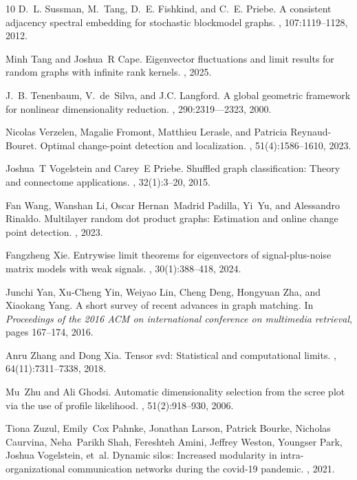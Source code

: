 \documentclass[12pt]{article}
\theoremstyle{definition}
\begin{document}
\begin{thebibliography}{10}
D.~L. Sussman, M.~Tang, D.~E. Fishkind, and C.~E. Priebe.
\newblock A consistent adjacency spectral embedding for stochastic blockmodel graphs.
, 107:1119--1128, 2012.

Minh Tang and Joshua~R Cape.
\newblock Eigenvector fluctuations and limit results for random graphs with infinite rank kernels.
, 2025.

J.~B. Tenenbaum, V.~de~Silva, and J.C. Langford.
\newblock A global geometric framework for nonlinear dimensionality reduction.
, 290:2319---2323, 2000.

Nicolas Verzelen, Magalie Fromont, Matthieu Lerasle, and Patricia Reynaud-Bouret.
\newblock Optimal change-point detection and localization.
, 51(4):1586--1610, 2023.

Joshua~T Vogelstein and Carey~E Priebe.
\newblock Shuffled graph classification: Theory and connectome applications.
, 32(1):3--20, 2015.

Fan Wang, Wanshan Li, Oscar Hernan~Madrid Padilla, Yi~Yu, and Alessandro Rinaldo.
\newblock Multilayer random dot product graphs: Estimation and online change point detection.
, 2023.

Fangzheng Xie.
\newblock Entrywise limit theorems for eigenvectors of signal-plus-noise matrix models with weak signals.
, 30(1):388--418, 2024.

Junchi Yan, Xu-Cheng Yin, Weiyao Lin, Cheng Deng, Hongyuan Zha, and Xiaokang Yang.
\newblock A short survey of recent advances in graph matching.
\newblock In {\em Proceedings of the 2016 ACM on international conference on multimedia retrieval}, pages 167--174, 2016.

Anru Zhang and Dong Xia.
\newblock Tensor svd: Statistical and computational limits.
, 64(11):7311--7338, 2018.

Mu~Zhu and Ali Ghodsi.
\newblock Automatic dimensionality selection from the scree plot via the use of profile likelihood.
, 51(2):918--930, 2006.

Tiona Zuzul, Emily~Cox Pahnke, Jonathan Larson, Patrick Bourke, Nicholas Caurvina, Neha~Parikh Shah, Fereshteh Amini, Jeffrey Weston, Youngser Park, Joshua Vogelstein, et~al.
\newblock Dynamic silos: Increased modularity in intra-organizational communication networks during the covid-19 pandemic.
, 2021.

\end{thebibliography}
\end{document}
